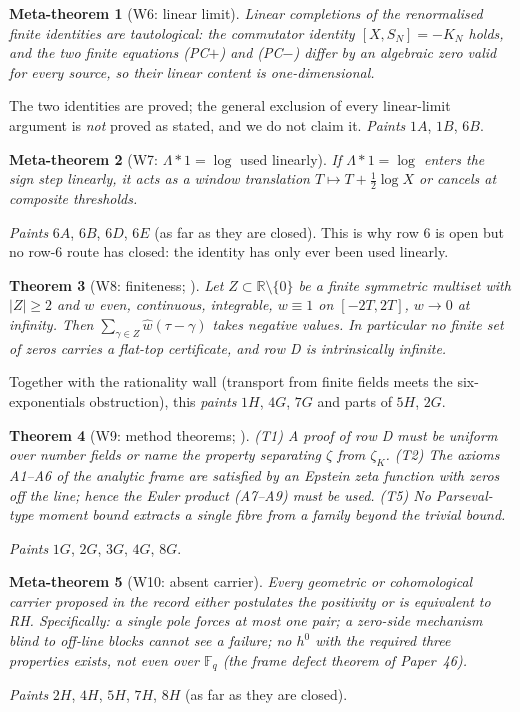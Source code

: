 \documentclass[11pt]{amsart}
\newtheorem{theorem}{Theorem}[section]
\newtheorem{metatheorem}[theorem]{Meta-theorem}
\theoremstyle{definition}
\theoremstyle{remark}
\newcommand{\R}{\mathbb R}
\begin{document}
\begin{metatheorem}[W6: linear limit]\label{W6}
Linear completions of the renormalised finite identities are tautological: the commutator identity
$[X,S_N]=-K_N$ holds, and the two finite equations (PC$+$) and (PC$-$) differ by an algebraic zero valid for
every source, so their linear content is one-dimensional.
\end{metatheorem}
\noindent The two identities are proved; the general exclusion of every linear-limit argument is
\emph{not} proved as stated, and we do not claim it. \emph{Paints} $1A$, $1B$, $6B$.

\begin{metatheorem}[W7: $\Lambda*1=\log$ used linearly]\label{W7}
If $\Lambda*1=\log$ enters the sign step linearly, it acts as a window translation $T\mapsto T+\frac12\log X$
or cancels at composite thresholds.
\end{metatheorem}
\noindent \emph{Paints} $6A$, $6B$, $6D$, $6E$ (as far as they are closed). This is why row 6 is open but no row-6
route has closed: the identity has only ever been used linearly.

\begin{theorem}[W8: finiteness; ]\label{thm:finZ}
Let $Z\subset\R\setminus\{0\}$ be a finite symmetric multiset with $|Z|\ge2$ and $w$ even, continuous,
integrable, $w\equiv1$ on $[-2T,2T]$, $w\to0$ at infinity. Then $\sum_{\gamma\in Z}\widehat w(\tau-\gamma)$
takes negative values. In particular no finite set of zeros carries a flat-top certificate, and row D is
intrinsically infinite.
\end{theorem}
\noindent Together with the rationality wall (transport from finite fields meets the six-exponentials
obstruction), this \emph{paints} $1H$, $4G$, $7G$ and parts of $5H$, $2G$.

\begin{theorem}[W9: method theorems; ]\label{W9}
(T1) A proof of row D must be uniform over number fields or name the property separating $\zeta$ from
$\zeta_K$. (T2) The axioms A1--A6 of the analytic frame are satisfied by an Epstein zeta function with
zeros off the line; hence the Euler product (A7--A9) must be used. (T5) No Parseval-type moment bound
extracts a single fibre from a family beyond the trivial bound.
\end{theorem}
\noindent \emph{Paints} $1G$, $2G$, $3G$, $4G$, $8G$.

\begin{metatheorem}[W10: absent carrier]\label{W10}
Every geometric or cohomological carrier proposed in the record either postulates the positivity or is
equivalent to RH. Specifically: a single pole forces at most one pair; a zero-side mechanism blind to
off-line blocks cannot see a failure; no $h^0$ with the required three properties exists, not even over
$\mathbb F_q$ (the frame defect theorem of Paper~46).
\end{metatheorem}
\noindent \emph{Paints} $2H$, $4H$, $5H$, $7H$, $8H$ (as far as they are closed).
\end{document}

